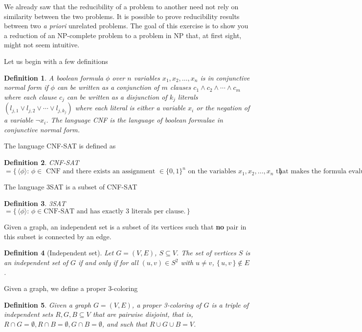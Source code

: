 \documentclass{article}
\newcommand{\definitionname}{Definition}
\newtheorem{definition}{\definitionname}
\newcommand{\st}{\colon\,}
\begin{document}
We already saw that the reducibility of a problem to
another need not rely on similarity between the two problems. It is
possible to prove reducibility results between two \emph{a priori} unrelated problems.
The goal of this exercise is to show you a reduction of an NP-complete
problem to a problem in NP that, at first sight, might not seem intuitive.

Let us begin with a few definitions
\begin{definition}
	A boolean formula \(\phi\) over \(n\) variables \(x_1,x_2,\ldots,x_n\) is in
	conjunctive normal form if \(\phi\) can be
	written as a conjunction of \(m\) clauses \(c_1 \land c_2 \land \cdots \land
	c_m\) where each clause \(c_j\) can be written as a disjunction of
	\(k_j\) literals
	\((l_{j,1} \lor l_{j,2} \lor \cdots \lor l_{j,k_j})\) where each literal is
	either a variable \(x_i\) or the negation of a variable \(\lnot x_i\).
	The language CNF is the language of boolean formulae in conjunctive normal
	form.
\end{definition}

The language CNF-SAT is defined as
\begin{definition}
  CNF-SAT $= \{\, \langle \phi \rangle \st \text{$\phi \in$ CNF and there exists an
  assignment $\in \{0,1\}^n$ on the variables $x_1,x_2,\ldots,x_n$ that
  makes the formula evaluate to true.}\,\}$
\end{definition}

The language 3SAT is a subset of CNF-SAT
\begin{definition}
  3SAT $= \{\,\langle \phi \rangle \st \phi \in \text{CNF-SAT and has
  exactly 3 literals per clause.}\,\}$
\end{definition}

Given a graph, an independent set is a subset of its vertices such that
\textbf{no} pair in this subset is connected by an edge.
\begin{definition}[Independent set]
  Let $G=(V,E)$, $S\subseteq V$. The set of vertices $S$ is an independent set
  of $G$ if and only if for all $(u,v) \in S^2$ with $u\ne v$, $\{\,u,v\,\} \not\in E$.
\end{definition}

Given a graph, we define a proper 3-coloring
\begin{definition}
  Given a graph $G=(V,E)$, a proper 3-coloring of $G$ is a triple of
  independent sets
  $R,G,B\subseteq V$ that are pairwise disjoint, that is, $R\cap G
  =\emptyset,R\cap B=\emptyset,G\cap B =\emptyset$, and such that $R\cup G\cup
  B = V$.
\end{definition}
\end{document}

